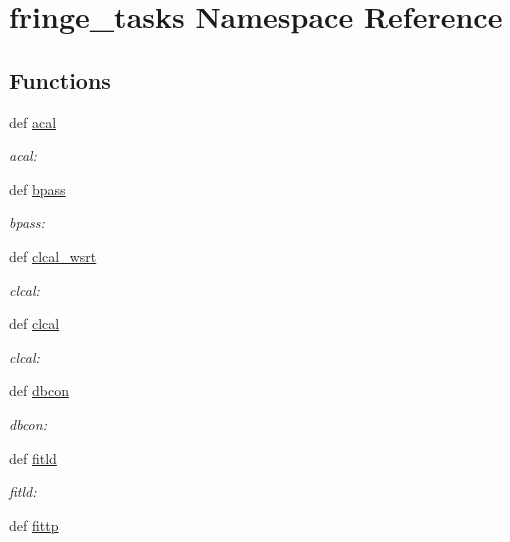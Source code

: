 \hypertarget{namespacefringe__tasks}{\section{fringe\-\_\-tasks \-Namespace \-Reference}
\label{namespacefringe__tasks}
}
\subsection*{\-Functions}
\begin{DoxyCompactItemize}
\item 
def \hyperlink{namespacefringe__tasks_a94107aea8ed98e8513f3f8322ab69290}{acal}
\begin{DoxyCompactList}\small\item\em acal\-: \end{DoxyCompactList}\item 
def \hyperlink{namespacefringe__tasks_acd9f970ff29e8fc8e7812df015cf8f70}{bpass}
\begin{DoxyCompactList}\small\item\em bpass\-: \end{DoxyCompactList}\item 
def \hyperlink{namespacefringe__tasks_a0c0f27cecfbb00ae771d59e1c0d3b66b}{clcal\-\_\-wsrt}
\begin{DoxyCompactList}\small\item\em clcal\-: \end{DoxyCompactList}\item 
def \hyperlink{namespacefringe__tasks_afff8513a11a6ac2cb0db0326d30e58af}{clcal}
\begin{DoxyCompactList}\small\item\em clcal\-: \end{DoxyCompactList}\item 
def \hyperlink{namespacefringe__tasks_ad81e5a1bef709330e27c911c2ab3e920}{dbcon}
\begin{DoxyCompactList}\small\item\em dbcon\-: \end{DoxyCompactList}\item 
def \hyperlink{namespacefringe__tasks_a1d1097db6bfb00a9a97f105029b3217a}{fitld}
\begin{DoxyCompactList}\small\item\em fitld\-: \end{DoxyCompactList}\item 
def \hyperlink{namespacefringe__tasks_ac00af45437f25f6b7e0df89a1276c72d}{fittp}

\end{DoxyCompactItemize}
